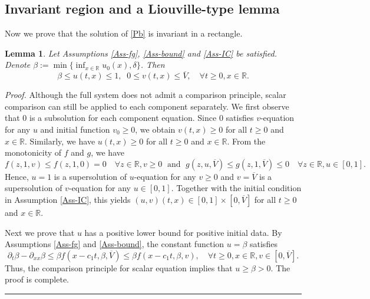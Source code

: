 \documentclass[10pt]{article}
\numberwithin{equation}{section}
\newcommand{\R}{\mathbb{R}}
\newtheorem{lemma}[theorem]{Lemma}
\newenvironment{proof}[1][Proof]{\noindent\textit{#1.} }{\hfill \rule{0.5em}{0.5em}}
\begin{document}
\subsection{Invariant region and a Liouville-type lemma}
Now we prove that the solution of \eqref{Pb} is  invariant in a rectangle. 
\begin{lemma}\label{Lem-bound}
Let Assumptions \ref{Ass-fg}, \ref{Ass-bound} and \ref{Ass-IC} be satisfied. Denote $\beta:= \min\{  \inf_{x\in\R } u_0(x),   \delta \}$.  Then  
$$\beta \leq  u(t,x)\leq 1,   \;\; 0 \leq v(t,x) \leq   \overline{V}, \quad  \forall  t\geq 0, x\in \R. $$  
\end{lemma}
\begin{proof}
 Although the full system does not admit  a comparison principle, scalar comparison can still be applied to each component separately.  We first observe that $0$ is a subsolution for each component equation.
 Since $0$ satisfies $v$-equation for any $u$   and initial function $v_0\geq 0$, we obtain $v(t,x) \geq 0$ for all $t\geq 0$ and $x\in \R$.  Similarly,  we have $u(t,x) \geq 0$ for all $t\geq 0$ and $x\in \R$.    From the monotonicity of $f$ and $g$, we have 
 $$   f(z, 1, v)  \leq  f(z,1,0) =0 \quad  \forall z\in \R, v\geq 0  \;  \text{ and }  \; g(z, u, \overline{V}) \leq g(z,1, \overline{V}) \leq 0 \quad \forall z\in\R,  u \in [0,1].$$
Hence, $u=1$ is a supersolution of $u$-equation for any $v\geq 0$ and $v= \overline{V}$ is a supersolution of $v$-equation for any $u \in [0,1]$.  Together with the initial condition in Assumption \ref{Ass-IC},  this yields $ (u, v)(t,x) \in [0, 1] \times [0, \overline{V}]$ for all $t\geq 0$  and $x\in \R$.

Next we prove that $u$ has  a positive lower bound for positive initial data.  By Assumptions \ref{Ass-fg} and \ref{Ass-bound}, the constant function  $u=\beta $  satisfies 
\begin{equation*}
\partial_t \beta  -\partial_{xx}  \beta \leq  \beta f(x-c_1 t,\beta, \overline{V} ) \leq  \beta f(x-c_1 t ,\beta, v ) ,  \quad \forall t\geq 0,  x\in \R, v\in [0, \overline{V}].
\end{equation*}
Thus, the comparison principle for scalar equation implies that $u\geq \beta>0$.  The proof is complete.


\end{proof}
\end{document}
